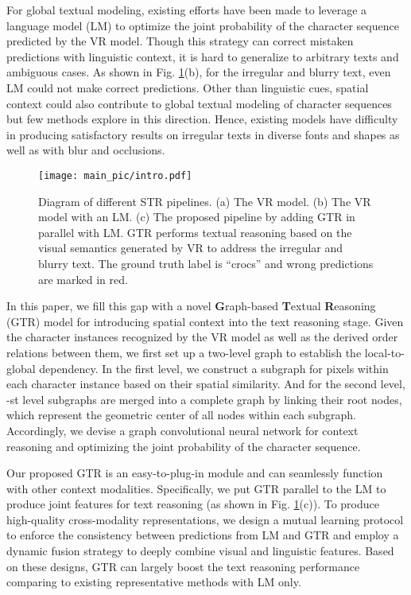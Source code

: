 \documentclass[letterpaper]{article} \usepackage{aaai22}  \usepackage{times}  \usepackage{helvet}  \usepackage{courier}  \usepackage[hyphens]{url}  \usepackage{graphicx} \urlstyle{rm} \def\UrlFont{\rm}  \usepackage{natbib}  \usepackage{caption} \DeclareCaptionStyle{ruled}{labelfont=normalfont,labelsep=colon,strut=off} \frenchspacing  \setlength{\pdfpagewidth}{8.5in}  \setlength{\pdfpageheight}{11in}
\begin{document}
For global textual modeling, existing efforts \cite{qiao2020seed,yu2020towards,fang2021read} have been made to leverage a language model (LM) \cite{jaderberg2014deep} to optimize the joint probability of the character sequence predicted by the VR model. Though this strategy can correct mistaken predictions with linguistic context, it is hard to generalize to arbitrary texts and ambiguous cases. As shown in Fig. \ref{fig:motivation}(b), for the irregular and blurry text, even LM could not make correct predictions. Other than linguistic cues, spatial context could also contribute to global textual modeling of character sequences but few methods explore in this direction. Hence, existing models have difficulty in producing satisfactory results on irregular texts in diverse fonts and shapes as well as with blur and occlusions.



\begin{figure}[t]
	\centering
	\texttt{[image: main\_pic/intro.pdf]}
	\caption{Diagram of different STR pipelines. (a) The VR model. (b) The VR model with an LM. (c) The proposed pipeline by adding GTR in parallel with LM. GTR performs textual reasoning based on the visual semantics generated by VR to address the irregular and blurry text. The ground truth label is ``crocs'' and wrong predictions are marked in red. }
    

	\label{fig:motivation}
	\vspace{-5mm}
\end{figure}


In this paper, we fill this gap with a novel \textbf{G}raph-based \textbf{T}extual \textbf{R}easoning (GTR) model for introducing spatial context into the text reasoning stage.
Given the character instances recognized by the VR model as well as the derived order relations between them, we first set up a two-level graph to establish the local-to-global dependency. In the first level, we construct a subgraph for pixels within each character instance based on their spatial similarity. And for the second level, -st level subgraphs are merged into a complete graph by linking their root nodes, which represent the geometric center of all nodes within each subgraph. Accordingly, we devise a graph convolutional neural network for context reasoning and optimizing the joint probability of the character sequence.

Our proposed GTR is an easy-to-plug-in module and can seamlessly function with other context modalities. Specifically, we put GTR parallel to the LM to produce joint features for text reasoning (as shown in Fig. \ref{fig:motivation}(c)). To produce high-quality cross-modality representations, we design a mutual learning protocol to enforce the consistency between predictions from LM and GTR and employ a dynamic fusion strategy \cite{yue2020robustscanner} to deeply combine visual and linguistic features. Based on these designs, GTR can largely boost the text reasoning performance comparing to existing representative methods with LM only.
\end{document}
